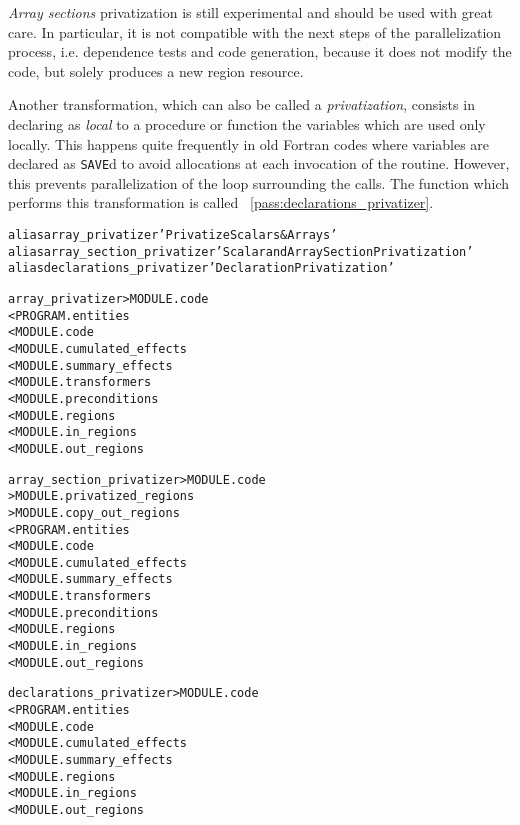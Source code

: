 \documentclass[a4paper]{report}
\newenvironment{PipsMake}{\begin{alltt}}{\end{alltt}}
\newcommand{\PipsPassRef}[1]{\texttt{\detokenize{#1}}~\ref{pass:#1}}
\newenvironment{PipsPass}[1]{\label{pass:#1}}{}
\begin{document}
\begin{PipsPass}{array_section_privatizer}
  {\em Array sections\/} privatization is still experimental and
  should be used with great care. In particular, it is not compatible
  with the next steps of the parallelization process, i.e. dependence
  tests and code generation, because it does not modify the code, but
  solely produces a new region resource.
\end{PipsPass}

\begin{PipsPass}{declarations_privatizer}
  Another transformation, which can also be called a
  \emph{privatization}, consists in declaring as \emph{local} to a
  procedure or function the variables which are used only
  locally. This happens quite frequently in old Fortran codes where
  variables are declared as {\tt SAVE}d to avoid allocations at each
  invocation of the routine. However, this prevents parallelization of
  the loop surrounding the calls. The function which performs this
  transformation is called \PipsPassRef{declarations_privatizer}.
\end{PipsPass}


\begin{PipsMake}
alias array_privatizer 'Privatize Scalars & Arrays'
alias array_section_privatizer 'Scalar and Array Section Privatization'
alias declarations_privatizer 'Declaration Privatization'
\end{PipsMake}

\begin{PipsMake}
array_privatizer             > MODULE.code
        < PROGRAM.entities
        < MODULE.code
        < MODULE.cumulated_effects
        < MODULE.summary_effects
        < MODULE.transformers
        < MODULE.preconditions
        < MODULE.regions
        < MODULE.in_regions
        < MODULE.out_regions

array_section_privatizer             > MODULE.code
                                     > MODULE.privatized_regions
                                     > MODULE.copy_out_regions
        < PROGRAM.entities
        < MODULE.code
        < MODULE.cumulated_effects
        < MODULE.summary_effects
        < MODULE.transformers
        < MODULE.preconditions
        < MODULE.regions
        < MODULE.in_regions
        < MODULE.out_regions

declarations_privatizer              > MODULE.code
        < PROGRAM.entities
        < MODULE.code
        < MODULE.cumulated_effects
        < MODULE.summary_effects
        < MODULE.regions
        < MODULE.in_regions
        < MODULE.out_regions

\end{PipsMake}
\end{document}
